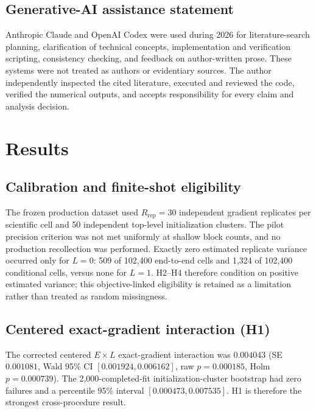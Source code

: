 \documentclass[pdflatex,sn-mathphys-num,Numbered]{sn-jnl}
\begin{document}
\subsection{Generative-AI assistance statement}

Anthropic Claude and OpenAI Codex were used during 2026 for literature-search planning, clarification of technical concepts, implementation and verification scripting, consistency checking, and feedback on author-written prose. These systems were not treated as authors or evidentiary sources. The author independently inspected the cited literature, executed and reviewed the code, verified the numerical outputs, and accepts responsibility for every claim and analysis decision.

\section{Results}

\subsection{Calibration and finite-shot eligibility}\label{sec:results-calibration}\label{sec:zero-variance-sensitivity}

The frozen production dataset used $R_{\mathrm{rep}}=30$ independent gradient replicates per scientific cell and 50 independent top-level initialization clusters. The pilot precision criterion was not met uniformly at shallow block counts, and no production recollection was performed. Exactly zero estimated replicate variance occurred only for $L=0$: 509 of 102,400 end-to-end cells and 1,324 of 102,400 conditional cells, versus none for $L=1$. H2--H4 therefore condition on positive estimated variance; this objective-linked eligibility is retained as a limitation rather than treated as random missingness.

\subsection{Centered exact-gradient interaction (H1)}\label{sec:h1-result}

The corrected centered $E\times L$ exact-gradient interaction was $0.004043$ (SE $0.001081$, Wald 95\% CI $[0.001924,0.006162]$, raw $p=0.000185$, Holm $p=0.000739$). The 2,000-completed-fit initialization-cluster bootstrap had zero failures and a percentile 95\% interval $[0.000473,0.007535]$. H1 is therefore the strongest cross-procedure result.
\end{document}

